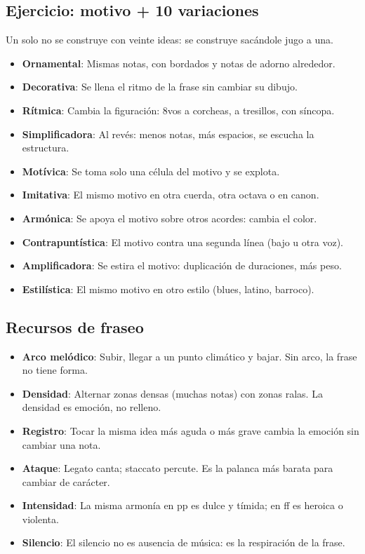 \documentclass[11pt,a4paper]{article}
\begin{document}
\subsection{Ejercicio: motivo + 10 variaciones}
Un solo no se construye con veinte ideas: se construye sac\'andole jugo a una.
\begin{itemize}
\item \textbf{Ornamental}: Mismas notas, con bordados y notas de adorno alrededor.
\item \textbf{Decorativa}: Se llena el ritmo de la frase sin cambiar su dibujo.
\item \textbf{Rítmica}: Cambia la figuración: 8vos a corcheas, a tresillos, con síncopa.
\item \textbf{Simplificadora}: Al revés: menos notas, más espacios, se escucha la estructura.
\item \textbf{Motívica}: Se toma solo una célula del motivo y se explota.
\item \textbf{Imitativa}: El mismo motivo en otra cuerda, otra octava o en canon.
\item \textbf{Armónica}: Se apoya el motivo sobre otros acordes: cambia el color.
\item \textbf{Contrapuntística}: El motivo contra una segunda línea (bajo u otra voz).
\item \textbf{Amplificadora}: Se estira el motivo: duplicación de duraciones, más peso.
\item \textbf{Estilística}: El mismo motivo en otro estilo (blues, latino, barroco).
\end{itemize}
\subsection{Recursos de fraseo}
\begin{itemize}
\item \textbf{Arco melódico}: Subir, llegar a un punto climático y bajar. Sin arco, la frase no tiene forma.
\item \textbf{Densidad}: Alternar zonas densas (muchas notas) con zonas ralas. La densidad es emoción, no relleno.
\item \textbf{Registro}: Tocar la misma idea más aguda o más grave cambia la emoción sin cambiar una nota.
\item \textbf{Ataque}: Legato canta; staccato percute. Es la palanca más barata para cambiar de carácter.
\item \textbf{Intensidad}: La misma armonía en pp es dulce y tímida; en ff es heroica o violenta.
\item \textbf{Silencio}: El silencio no es ausencia de música: es la respiración de la frase.
\end{itemize}
\newpage
\end{document}
